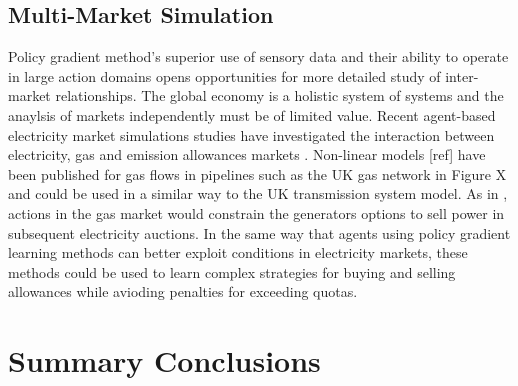 \section{Multi-Market Simulation}
Policy gradient method's superior use of sensory data and their ability to
operate in large action domains opens opportunities for more detailed study of
inter-market relationships.  The global economy is a holistic system of
systems and the anaylsis of markets independently must be of limited value.
Recent agent-based electricity market simulations studies have investigated the
interaction between electricity, gas and emission allowances markets
\cite{krause:gas,wang:09}.  Non-linear models [ref] have been published for gas
flows in pipelines such as the UK gas network in Figure X and could be used in a
similar way to the UK transmission system model.  As in ,
actions in the gas market would constrain the generators options to sell power
in subsequent electricity auctions.  In the same way that agents using policy
gradient learning methods can better exploit conditions in electricity markets,
these methods could be used to learn complex strategies for buying and selling
allowances while avioding penalties for exceeding quotas.


%
%


\chapter{Summary Conclusions}
\label{ch:conclusion}

